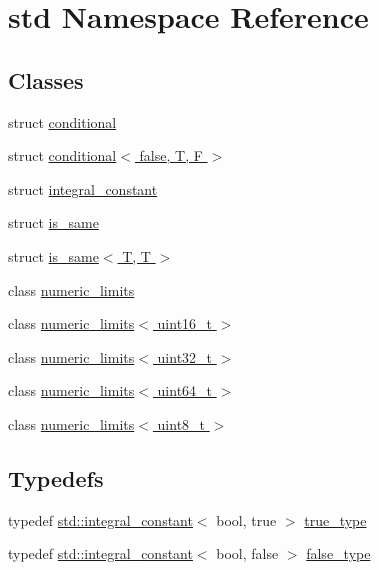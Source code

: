 \hypertarget{namespacestd}{}\section{std Namespace Reference}
\label{namespacestd}
\subsection*{Classes}
\begin{DoxyCompactItemize}
\item 
struct \hyperlink{structstd_1_1conditional}{conditional}
\item 
struct \hyperlink{structstd_1_1conditional_3_01false_00_01T_00_01F_01_4}{conditional$<$ false, T, F $>$}
\item 
struct \hyperlink{structstd_1_1integral__constant}{integral\+\_\+constant}
\item 
struct \hyperlink{structstd_1_1is__same}{is\+\_\+same}
\item 
struct \hyperlink{structstd_1_1is__same_3_01T_00_01T_01_4}{is\+\_\+same$<$ T, T $>$}
\item 
class \hyperlink{classstd_1_1numeric__limits}{numeric\+\_\+limits}
\item 
class \hyperlink{classstd_1_1numeric__limits_3_01uint16__t_01_4}{numeric\+\_\+limits$<$ uint16\+\_\+t $>$}
\item 
class \hyperlink{classstd_1_1numeric__limits_3_01uint32__t_01_4}{numeric\+\_\+limits$<$ uint32\+\_\+t $>$}
\item 
class \hyperlink{classstd_1_1numeric__limits_3_01uint64__t_01_4}{numeric\+\_\+limits$<$ uint64\+\_\+t $>$}
\item 
class \hyperlink{classstd_1_1numeric__limits_3_01uint8__t_01_4}{numeric\+\_\+limits$<$ uint8\+\_\+t $>$}
\end{DoxyCompactItemize}
\subsection*{Typedefs}
\begin{DoxyCompactItemize}
\item 
typedef \hyperlink{structstd_1_1integral__constant}{std\+::integral\+\_\+constant}$<$ bool, true $>$ \hyperlink{namespacestd_aa6e018097e10f59c32d1d85a983fb30e}{true\+\_\+type}
\item 
typedef \hyperlink{structstd_1_1integral__constant}{std\+::integral\+\_\+constant}$<$ bool, false $>$ \hyperlink{namespacestd_a4d6c2e22a7f5a344d0170494bbb065e3}{false\+\_\+type}
\end{DoxyCompactItemize}


